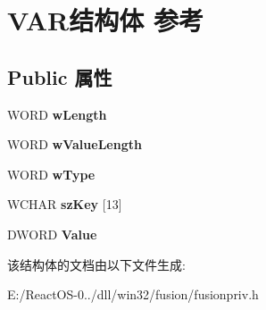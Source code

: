 \hypertarget{struct_v_a_r}{}\section{V\+A\+R结构体 参考}
\label{struct_v_a_r}
\subsection*{Public 属性}
\begin{DoxyCompactItemize}
\item 
\mbox{\label{struct_v_a_r_aa94d122d3dcc0883819582096784ed42}} 
W\+O\+RD {\bfseries w\+Length}
\item 
\mbox{\label{struct_v_a_r_a2a7d4a60b456615cc28bee97a9e93ca7}} 
W\+O\+RD {\bfseries w\+Value\+Length}
\item 
\mbox{\label{struct_v_a_r_a063f30841c788e15e8f71f03d4685a4d}} 
W\+O\+RD {\bfseries w\+Type}
\item 
\mbox{\label{struct_v_a_r_ac2bacf1bb8b85a8f880f0110db33bb01}} 
W\+C\+H\+AR {\bfseries sz\+Key} \mbox{[}13\mbox{]}
\item 
\mbox{\label{struct_v_a_r_ae6233fc53ded51c9ceb28f6495a94d4d}} 
D\+W\+O\+RD {\bfseries Value}
\end{DoxyCompactItemize}


该结构体的文档由以下文件生成\+:\begin{DoxyCompactItemize}
\item 
E\+:/\+React\+O\+S-\/0../dll/win32/fusion/fusionpriv.\+h\end{DoxyCompactItemize}
